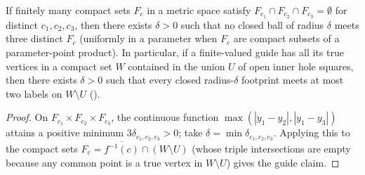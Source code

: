 \begin{lemma}
    \label{lem:peps_dyadic_footprint}
    \leanok
    If finitely many compact sets $F_c$ in a metric space satisfy
    $F_{c_1}\cap F_{c_2}\cap F_{c_3}=\emptyset$ for distinct $c_1,c_2,c_3$, then
    there exists $\delta>0$ such that no closed ball of radius $\delta$ meets
    three distinct $F_c$ (uniformly in a parameter when $F_c$ are compact subsets
    of a parameter-point product). In particular, if a finite-valued guide has all
    its true vertices in a compact set $W$ contained in the union $U$ of open
    inner hole squares, then there exists $\delta>0$ such that every closed
    radius-$\delta$ footprint meets at most two labels on $W\setminus U$
    (\cite[Section~7, lines 453--469, 475--479]{OpenAI2026PolynomialPEPS}).
\end{lemma}

\begin{proof}\leanok
    On $F_{c_1}\times F_{c_2}\times F_{c_3}$, the continuous function
    $\max(|y_1-y_2|,|y_1-y_3|)$ attains a positive minimum $3\delta_{c_1,c_2,c_3}>0$;
    take $\delta=\min\delta_{c_1,c_2,c_3}$. Applying this to the compact sets
    $F_c=\overline{f^{-1}(c)}\cap(W\setminus U)$ (whose triple intersections are
    empty because any common point is a true vertex in $W\setminus U$) gives the
    guide claim.
\end{proof}

